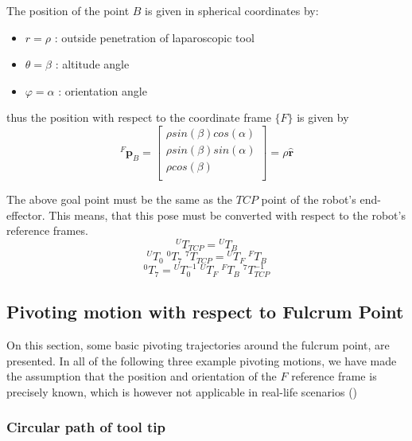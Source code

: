 The position of the point $B$ is given in spherical coordinates by:
\begin{itemize}
	\item $r=ρ$ : outside penetration of laparoscopic tool
	\item $θ=β$ : altitude angle
	\item $φ=α$ : orientation angle
\end{itemize}
thus the position with respect to the coordinate frame $\lbrace F \rbrace$ is given by
\begin{equation}
{}^{F}\mathbf{p}^{}_B = \begin{bmatrix}
ρsin(β)cos(α) \\
ρsin(β)sin(α) \\
ρcos(β) \\
\end{bmatrix} = ρ \hat{\mathbf{r}}
\end{equation}

The above goal point must be the same as the $TCP$ point of the robot's end-effector. This means, that this pose must be converted with respect to the robot's reference frames.
\[
{}^{U}T^{}_{TCP} = {}^{U}T^{}_{B}
\]
\[
{}^{U}T^{}_{0} \; {}^{0}T^{}_{7} \; {}^{7}T^{}_{TCP} = {}^{U}T^{}_{F} \; {}^{F}T^{}_{B}
\]
\begin{equation}
{}^{0}T^{}_{7} = {}^{U}T^{-1}_{0} \; {}^{U}T^{}_{F} \; {}^{F}T^{}_{B} \; {}^{7}T^{-1}_{TCP}
\end{equation}

\subsection{Pivoting motion with respect to Fulcrum Point}
\label{subsection:pivot-motions}

On this section, some basic pivoting trajectories around the fulcrum point, are presented. In all of the following three example pivoting motions, we have made 
the assumption that the position and orientation of the ${F}$ reference frame is precisely known, which is however not applicable in real-life scenarios ()

\subsubsection{Circular path of tool tip}

